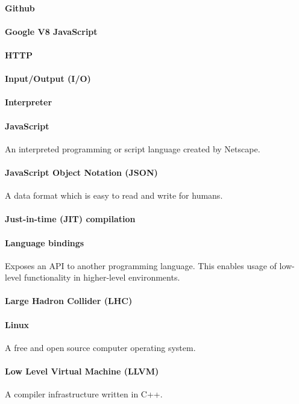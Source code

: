 \paragraph{Github}
\paragraph{Google V8 JavaScript}
\paragraph{HTTP}
\paragraph{Input/Output (I/O)}
\paragraph{Interpreter}
\paragraph{JavaScript}
An interpreted programming or script language created by Netscape.
\paragraph{JavaScript Object Notation (JSON)}
A data format which is easy to read and write for humans.
\paragraph{Just-in-time (JIT) compilation}
\paragraph{Language bindings}
Exposes an API to another programming language. This enables usage of low-level functionality in higher-level environments.
\paragraph{Large Hadron Collider (LHC)}
\paragraph{Linux}
A free and open source computer operating system.
\paragraph{Low Level Virtual Machine (LLVM)}
A compiler infrastructure written in C++.
